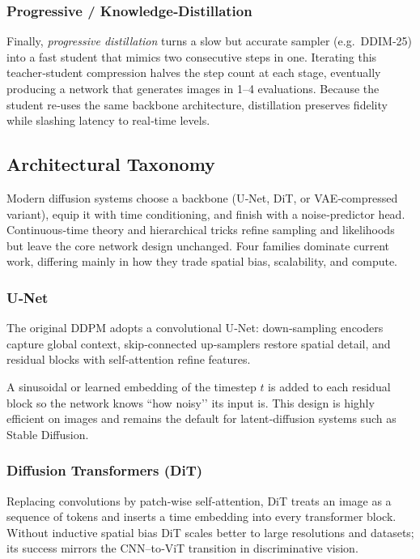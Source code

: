\documentclass{article}
\begin{document}
\subsubsection{Progressive / Knowledge‑Distillation}
Finally, \emph{progressive distillation} turns a slow but accurate sampler (e.g.\ DDIM‑25) into a fast student that mimics two consecutive steps in one.  Iterating this teacher‑student compression halves the step count at each stage, eventually producing a network that generates images in 1–4 evaluations.  Because the student re‑uses the same backbone architecture, distillation preserves fidelity while slashing latency to real‑time levels.


\subsection{Architectural Taxonomy}
Modern diffusion systems choose a backbone (U‑Net, DiT, or VAE‑compressed variant), equip it with time conditioning, and finish with a noise‑predictor head. Continuous‑time theory and hierarchical tricks refine sampling and likelihoods but leave the core network design unchanged. Four families dominate current work, differing mainly in how they trade spatial bias, scalability, and compute.

\subsubsection{U‑Net}  
The original DDPM adopts a convolutional U‑Net: down‑sampling encoders capture global context, skip‑connected up‑samplers restore spatial detail, and residual blocks with self‑attention refine features.

A sinusoidal or learned embedding of the timestep \(t\) is added to each residual block so the network knows “how noisy’’ its input is. This design is highly efficient on images and remains the default for latent‑diffusion systems such as Stable Diffusion.

\subsubsection{Diffusion Transformers (DiT)}  
Replacing convolutions by patch‑wise self‑attention, DiT treats an image as a sequence of tokens and inserts a time embedding into every transformer block. Without inductive spatial bias DiT scales better to large resolutions and datasets; its success mirrors the CNN–to‑ViT transition in discriminative vision.
\end{document}
